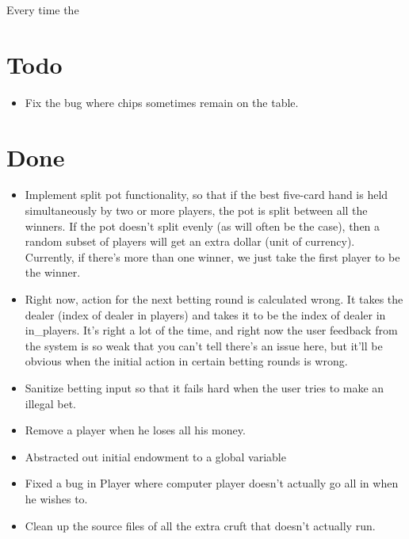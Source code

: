 \documentclass{article}
\begin{document}
Every time the 
\section*{Todo}
\begin{itemize}
\item Fix the bug where chips sometimes remain on the table.
\end{itemize}

\section*{Done}
\begin{itemize}
\item \CheckedBox Implement split pot functionality, so that if the best five-card
  hand is held simultaneously by two or more players, the pot is split
  between all the winners. If the pot doesn't split evenly (as will
  often be the case), then a random subset of players will get an
  extra dollar (unit of currency). Currently, if there's more than one
  winner, we just take the first player to be the winner.
\item \CheckedBox Right now, action for the next betting round is calculated
  wrong. It takes the dealer (index of dealer in players) and takes it
  to be the index of dealer in in\_players. It's right a lot of the
  time, and right now the user feedback from the system is so weak
  that you can't tell there's an issue here, but it'll be obvious when
  the initial action in certain betting rounds is wrong.
\item \CheckedBox Sanitize betting input so that it fails hard when the user tries
  to make an illegal bet.
\item \CheckedBox Remove a player when he loses all his money.
\item \CheckedBox Abstracted out initial endowment to a global variable
\item \CheckedBox Fixed a bug in Player where computer player doesn't
  actually go all in when he wishes to.
\item \CheckedBox Clean up the source files of all the extra cruft that doesn't actually run.
\end{itemize}
\end{document}
